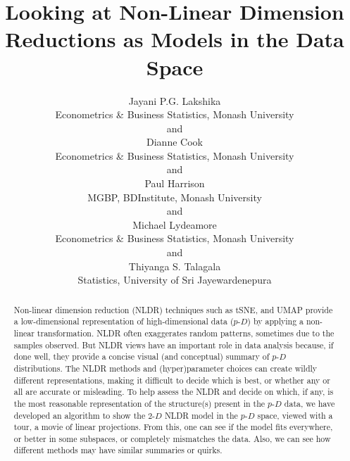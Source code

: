 \documentclass[
  12pt]{article}
\newcommand\pD{$p\text{-}D$}
\newcommand\gD{$2\text{-}D$}
\begin{document}
\def\spacingset#1{\renewcommand{\baselinestretch}%
{#1}\small\normalsize} \spacingset{1}



\title{\bf Looking at Non-Linear Dimension Reductions as Models in the
Data Space}
\author{
Jayani P.G. Lakshika\\
Econometrics \& Business Statistics, Monash University\\
and\\Dianne Cook\\
Econometrics \& Business Statistics, Monash University\\
and\\Paul Harrison\\
MGBP, BDInstitute, Monash University\\
and\\Michael Lydeamore\\
Econometrics \& Business Statistics, Monash University\\
and\\Thiyanga S. Talagala\\
Statistics, University of Sri Jayewardenepura\\
}
\maketitle

\bigskip
\bigskip
\begin{abstract}
Non-linear dimension reduction (NLDR) techniques such as tSNE, and UMAP
provide a low-dimensional representation of high-dimensional data
(\pD{}) by applying a non-linear transformation. NLDR often exaggerates
random patterns, sometimes due to the samples observed. But NLDR views
have an important role in data analysis because, if done well, they
provide a concise visual (and conceptual) summary of \pD{}
distributions. The NLDR methods and (hyper)parameter choices can create
wildly different representations, making it difficult to decide which is
best, or whether any or all are accurate or misleading. To help assess
the NLDR and decide on which, if any, is the most reasonable
representation of the structure(s) present in the \pD{} data, we have
developed an algorithm to show the \gD{} NLDR model in the \pD{} space,
viewed with a tour, a movie of linear projections. From this, one can
see if the model fits everywhere, or better in some subspaces, or
completely mismatches the data. Also, we can see how different methods
may have similar summaries or quirks.
\end{abstract}
\end{document}

